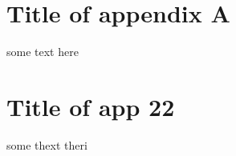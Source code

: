 \appendix
	\section{Title of appendix A}
		some text here
		\blankpage
		
	\section{Title of app 22}
	some thext theri
	\blankpage
	